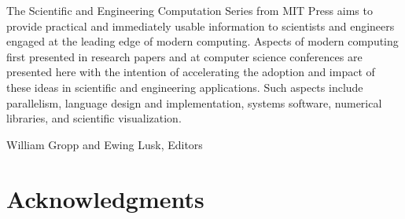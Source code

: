  

\cleardoublepage
\seriesforward

\noindent 
The Scientific and Engineering Computation Series from MIT Press aims to
provide practical and immediately usable information to scientists and
engineers engaged at the leading edge of modern computing.  Aspects of
modern computing first presented in research papers and at computer
science conferences are presented here
with the intention of accelerating the adoption and impact of these ideas in
scientific and engineering applications.  Such aspects include
parallelism, language design and implementation, systems software,
numerical libraries, and scientific visualization.

\vspace{2pc}
\noindent
William Gropp and Ewing Lusk, Editors\\



\noindent 

 
 


\section*{Acknowledgments}

%
%


% 
 
\secondbooktitlepage
 
